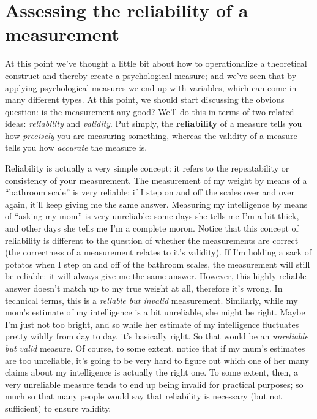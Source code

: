 \documentclass[]{book}
\begin{document}
\hypertarget{assessing-the-reliability-of-a-measurement}{%
\section{Assessing the reliability of a measurement}\label{assessing-the-reliability-of-a-measurement}}

At this point we've thought a little bit about how to operationalize a theoretical construct and thereby create a psychological measure; and we've seen that by applying psychological measures we end up with variables, which can come in many different types. At this point, we should start discussing the obvious question: is the measurement any good? We'll do this in terms of two related ideas: {\emph{reliability}} and {\emph{validity}}. Put simply, the \textbf{reliability} of a measure tells you how {\emph{precisely}} you are measuring something, whereas the validity of a measure tells you how {\emph{accurate}} the measure is.

Reliability is actually a very simple concept: it refers to the repeatability or consistency of your measurement. The measurement of my weight by means of a ``bathroom scale'' is very reliable: if I step on and off the scales over and over again, it'll keep giving me the same answer. Measuring my intelligence by means of ``asking my mom'' is very unreliable: some days she tells me I'm a bit thick, and other days she tells me I'm a complete moron. Notice that this concept of reliability is different to the question of whether the measurements are correct (the correctness of a measurement relates to it's validity). If I'm holding a sack of potatos when I step on and off of the bathroom scales, the measurement will still be reliable: it will always give me the same answer. However, this highly reliable answer doesn't match up to my true weight at all, therefore it's wrong. In technical terms, this is a {\emph{reliable but invalid}} measurement. Similarly, while my mom's estimate of my intelligence is a bit unreliable, she might be right. Maybe I'm just not too bright, and so while her estimate of my intelligence fluctuates pretty wildly from day to day, it's basically right. So that would be an {\emph{unreliable but valid}} measure. Of course, to some extent, notice that if my mum's estimates are too unreliable, it's going to be very hard to figure out which one of her many claims about my intelligence is actually the right one. To some extent, then, a very unreliable measure tends to end up being invalid for practical purposes; so much so that many people would say that reliability is necessary (but not sufficient) to ensure validity.
\end{document}
